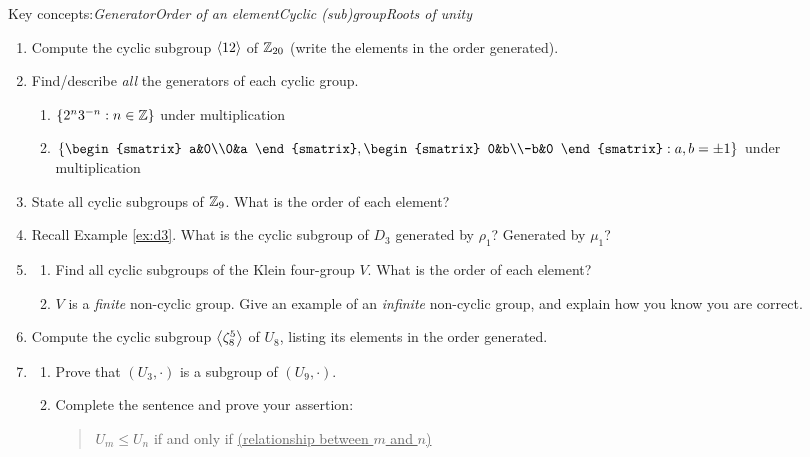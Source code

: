 \begin{exercises}
	Key concepts:\quad \emph{Generator\quad Order of an element\quad Cyclic (sub)group\quad Roots of unity}
	
	\begin{enumerate}	  
	  \item Compute the cyclic subgroup $\left\langle 12\right\rangle$ of $\mathbb{Z}_{20}$ (write the elements in the order generated).
	  
	  
		\item Find/describe \emph{all} the generators of each cyclic group.
	  \begin{enumerate}
	      \item {}
	      $\{2^n3^{-n}:n\in\mathbb{Z}\}$ under multiplication
	      \setcounter{enumii}{2}
	      \item {}
	      $\left\{\begin{smatrix} a&0\\0&a \end{smatrix},\begin{smatrix} 0&b\\-b&0 \end{smatrix}: a,b=\pm 1\right\}$ under multiplication
	  \end{enumerate}
	  
	  
	  \item State all cyclic subgroups of $\mathbb{Z}_{9}$. What is the order of each element?
	
	
	  \item Recall Example \ref{ex:d3}. What is the cyclic subgroup of $D_3$ generated by $\rho_1$? Generated by $\mu_1$?
	  
	  
	  \item\label{exs:kleinnoncyclic}\begin{enumerate}
	    \item Find all cyclic subgroups of the Klein four-group $V$. What is the order of each element?
			\item $V$ is a \emph{finite} non-cyclic group. Give an example of an \emph{infinite} non-cyclic group, and explain how you know you are correct.
	  \end{enumerate}
	  
	  
	  \item Compute the cyclic subgroup $\left\langle \zeta_8^5\right\rangle$ of $U_8$, listing its elements in the order generated. 
	  	  
	  
		\item\begin{enumerate}
		  \item Prove that $(U_3,\cdot)$ is a subgroup of $(U_9,\cdot)$.
		  \item Complete the sentence and prove your assertion:
		  \begin{quote}
		  	$U_m\le U_n$ if and only if \underline{\qquad\scriptsize(relationship between $m$ and $n$)\qquad}
		  \end{quote}
		\end{enumerate}
	    	

\end{enumerate}
\end{exercises}
